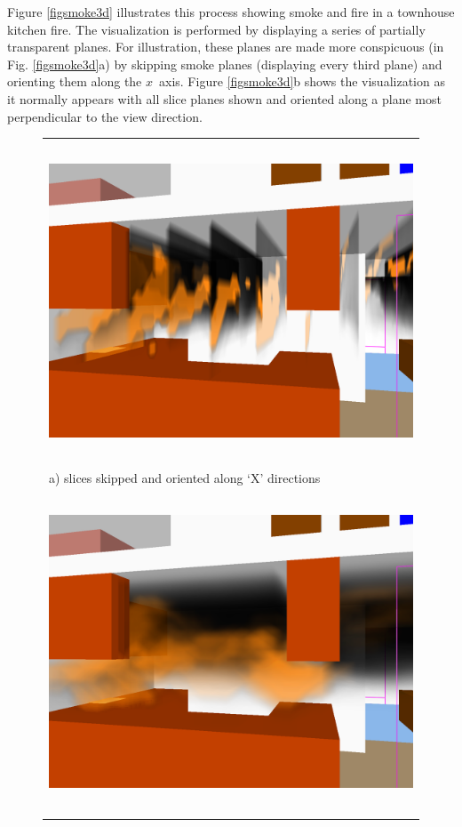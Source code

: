 {Figure \ref{figsmoke3d} illustrates this process showing smoke and
fire in a townhouse kitchen fire. The visualization is performed
by displaying a series of partially transparent planes. For
illustration, these planes are made more conspicuous (in Fig.
\ref{figsmoke3d}a) by skipping smoke planes (displaying every
third plane) and orienting them along the $x$~axis. Figure
\ref{figsmoke3d}b shows the visualization as it normally appears
with all slice planes shown and oriented along a plane most
perpendicular to the view direction.

\begin{figure}[\figoptions]
\begin{center}
\begin{tabular}{l}
\includegraphics[height=3.75in]{FIGURES/thouse5c_skip}\\
a) slices skipped and oriented along `X' directions\\
\includegraphics[height=3.75in]{FIGURES/thouse5c_full}\\

\end{tabular}
\end{center}
\end{figure}}
